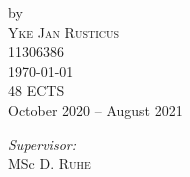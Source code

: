 \begin{titlepage}




by\\[0.2cm]

\textsc{\Large Yke Jan Rusticus}\\[0.2cm] %

11306386\\[1cm]










{\Large \today}\\[1cm] %



48 ECTS\\ %

October 2020 -- August 2021\\[1cm]%






\begin{minipage}[t]{0.4\textwidth}

\begin{flushleft} \large

\emph{Supervisor:} \\

MSc D. \textsc{Ruhe} %

\end{flushleft}

\end{minipage}

~

\begin{minipage}[t]{0.4\textwidth}

\begin{flushright} \large


\end{flushright}
\end{minipage}
\end{titlepage}
